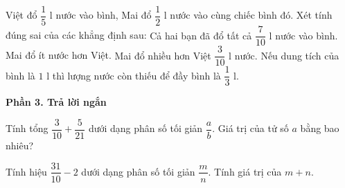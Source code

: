 \begin{ex} %
Việt đổ $\dfrac{1}{5}\text{ l}$ nước vào bình, Mai đổ $\dfrac{1}{2}\text{ l}$ nước vào cùng chiếc bình đó. Xét tính đúng sai của các khẳng định sau:
\choiceTF
{\True Cả hai bạn đã đổ tất cả $\dfrac{7}{10}\text{ l}$ nước vào bình.}
{Mai đổ ít nước hơn Việt.}
{\True Mai đổ nhiều hơn Việt $\dfrac{3}{10}\text{ l}$ nước.}
{Nếu dung tích của bình là $1\text{ l}$ thì lượng nước còn thiếu để đầy bình là $\dfrac{1}{3}\text{ l}$.}
\end{ex}

\textbf{Phần 3. Trả lời ngắn}

\begin{ex} %
Tính tổng $\dfrac{3}{10} + \dfrac{5}{21}$ dưới dạng phân số tối giản $\dfrac{a}{b}$. Giá trị của tử số $a$ bằng bao nhiêu?
\end{ex}

\begin{ex} %
Tính hiệu $\dfrac{31}{10} - 2$ dưới dạng phân số tối giản $\dfrac{m}{n}$. Tính giá trị của $m + n$.
\end{ex}

